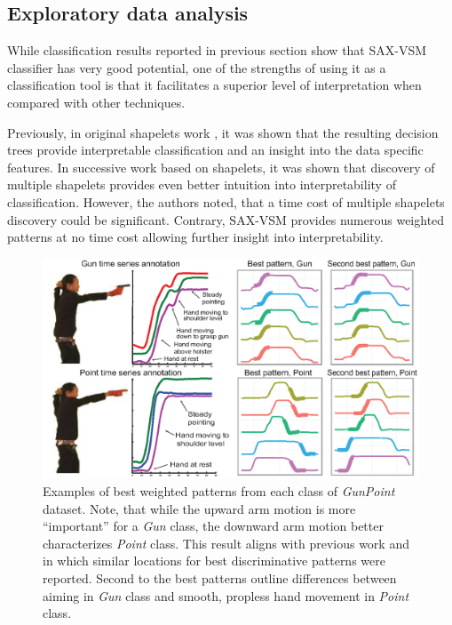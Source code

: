 \documentclass{llncs}
\newcommand{\myfigureshrinker}{\vspace{-1cm}}
\begin{document}
\subsection{Exploratory data analysis}
While classification results reported in previous section show that SAX-VSM classifier
has very good potential, one of the strengths of using it as a classification tool is that
it facilitates a superior level of interpretation when compared with other techniques. 

Previously, in original shapelets work \cite{shapelet}, it was shown 
that the resulting decision trees provide interpretable classification and an insight into the data
specific features. In successive work \cite{bagnal} based on shapelets, it was shown that
discovery of multiple shapelets provides even better intuition into interpretability of
classification. However, the authors noted, that a time cost of multiple shapelets discovery
could be significant. Contrary, SAX-VSM provides numerous weighted patterns at no time cost
allowing further insight into interpretability.

\begin{figure}[t]
   \myfigureshrinker
   \centering
   \includegraphics[width=115mm]{figures/gun-point.eps}
   \caption{Examples of best weighted patterns from each class of \textit{GunPoint} dataset. 
   Note, that while the upward arm motion is more ``important'' for a \textit{Gun} class, 
   the downward arm motion better characterizes \textit{Point} class. 
   This result aligns with previous work \cite{shapelet} and \cite{bagnal} in which similar 
   locations for best discriminative patterns were reported. 
   Second to the best patterns outline differences between aiming in \textit{Gun} class and
   smooth, propless hand movement in \textit{Point} class.
   }
   \label{fig:shapelet-like-patterns}
\end{figure}
\end{document}
